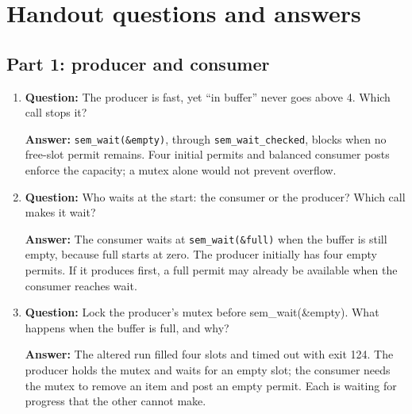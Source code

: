 \documentclass[12pt]{article}
\begin{document}
\clearpage
\section{Handout questions and answers}
\subsection{Part 1: producer and consumer}
\begin{enumerate}
\item \textbf{Question:} The producer is fast, yet ``in buffer'' never goes above 4. Which call stops it?
\par\textbf{Answer:} \texttt{sem\_wait(\&empty)}, through
\texttt{sem\_wait\_checked}, blocks when no free-slot permit remains.
Four initial permits and balanced consumer posts enforce the capacity;
a mutex alone would not prevent overflow.

\item \textbf{Question:} Who waits at the start: the consumer or the producer? Which call makes it wait?
\par\textbf{Answer:} The consumer waits at \texttt{sem\_wait(\&full)}
when the buffer is still empty, because full starts at zero. The producer
initially has four empty permits. If it produces first, a full permit may
already be available when the consumer reaches wait.

\item \textbf{Question:} Lock the producer's mutex before sem\_wait(\&empty). What happens when the buffer is full, and why?
\par\textbf{Answer:} The altered run filled four slots and timed out with
exit 124. The producer holds the mutex and waits for an empty slot; the
consumer needs the mutex to remove an item and post an empty permit.
Each is waiting for progress that the other cannot make.
\end{enumerate}
\end{document}

